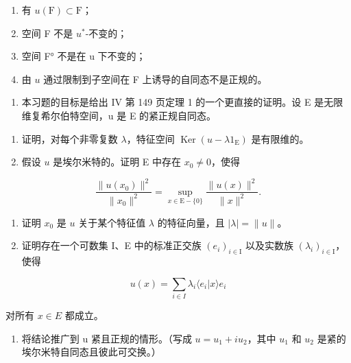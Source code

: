 \begin{enumerate}
\def\labelenumi{(\roman{enumi})}
\item
  有 \(u(\mathrm{F}) \subset \mathrm{F}\)；
\item
  空间 F 不是 \(u^{*}\)-不变的；
\item
  空间 F° 不是在 u 下不变的；
\item
  由 \(u\) 通过限制到子空间在 F 上诱导的自同态不是正规的。
\end{enumerate}

\begin{enumerate}
\def\labelenumi{\arabic{enumi})}
\setcounter{enumi}{6}
\tightlist
\item
  本习题的目标是给出 IV 第 149 页定理 1 的一个更直接的证明。设 E 是无限维复希尔伯特空间，u 是 E 的紧正规自同态。
\end{enumerate}

\begin{enumerate}
\def\labelenumi{\alph{enumi})}
\item
  证明，对每个非零复数 \(\lambda\)，特征空间 \(\operatorname{Ker}(u - \lambda 1_{\mathrm{E}})\) 是有限维的。
\item
  假设 \(u\) 是埃尔米特的。证明 E 中存在 \(x_0 \neq 0\)，使得
\end{enumerate}

\[
\frac {\| u (x _ {0}) \| ^ {2}}{\| x _ {0} \| ^ {2}} = \sup _ {x \in \mathrm{E} - \{0 \}} \frac {\| u (x) \| ^ {2}}{\| x \| ^ {2}}.
\]

\begin{enumerate}
\def\labelenumi{\alph{enumi})}
\setcounter{enumi}{2}
\item
  证明 \(x_{0}\) 是 \(u\) 关于某个特征值 \(\lambda\) 的特征向量，且 \(|\lambda| = \|u\|\)。
\item
  证明存在一个可数集 I、E 中的标准正交族 \((e_{i})_{i\in\mathrm{I}}\) 以及实数族 \((\lambda_{i})_{i\in\mathrm{I}}\)，使得
\end{enumerate}

\[
u (x) = \sum_ {i \in I} \lambda_ {i} \langle e _ {i} | x \rangle e _ {i}
\]

对所有 \(x \in E\) 都成立。

\begin{enumerate}
\def\labelenumi{\alph{enumi})}
\setcounter{enumi}{4}
\tightlist
\item
  将结论推广到 u 紧且正规的情形。（写成 \(u = u_{1} + iu_{2}\)，其中 \(u_{1}\) 和 \(u_{2}\) 是紧的埃尔米特自同态且彼此可交换。）
\end{enumerate}


